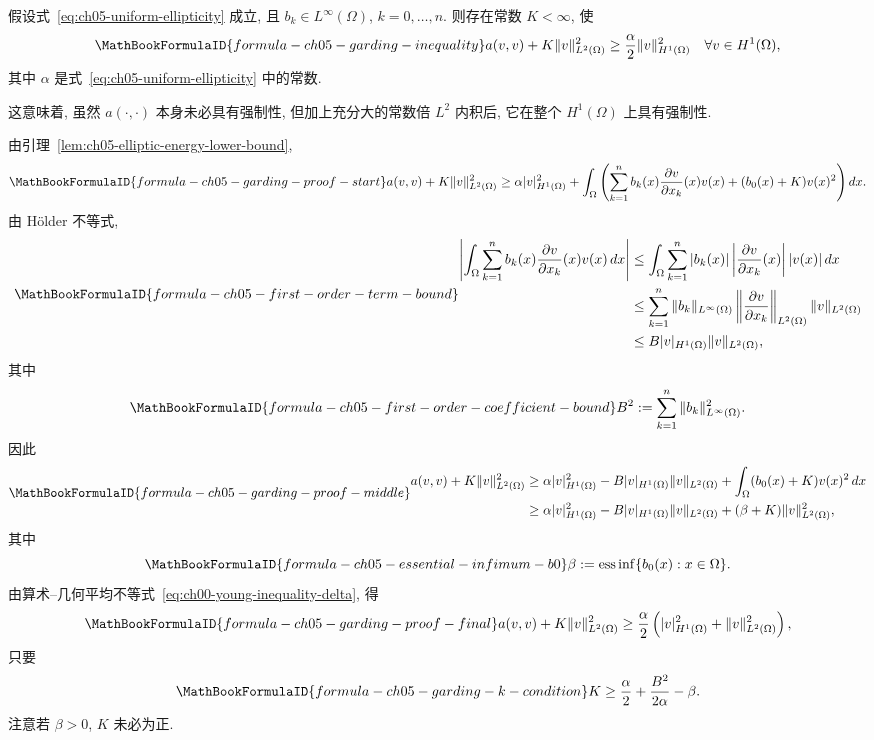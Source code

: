 \begin{Theorem}
\label{thm:ch05-garding-inequality}
假设式~\eqref{eq:ch05-uniform-ellipticity} 成立, 且 $b_k\in L^\infty(\Omega)$, $k=0,\ldots,n$. 则存在常数 $K<\infty$, 使
\[
\MathBookFormulaID{formula-ch05-garding-inequality}
a(v,v)+K\|v\|_{L^2(\Omega)}^2
\geq\frac\alpha2\|v\|_{H^1(\Omega)}^2
\quad\forall v\in H^1(\Omega),
\]
其中 $\alpha$ 是式~\eqref{eq:ch05-uniform-ellipticity} 中的常数.
\end{Theorem}
这意味着, 虽然 $a(\cdot,\cdot)$ 本身未必具有强制性, 但加上充分大的常数倍 $L^2$ 内积后, 它在整个 $H^1(\Omega)$ 上具有强制性.
\begin{Proof}
由引理~\ref{lem:ch05-elliptic-energy-lower-bound},
\[
\MathBookFormulaID{formula-ch05-garding-proof-start}
a(v,v)+K\|v\|_{L^2(\Omega)}^2
\geq\alpha|v|_{H^1(\Omega)}^2
+\int_\Omega\left(\sum_{k=1}^nb_k(x)\frac{\partial v}{\partial x_k}(x)v(x)
+(b_0(x)+K)v(x)^2\right)dx.
\]
由 Hölder 不等式,
\[
\MathBookFormulaID{formula-ch05-first-order-term-bound}
\begin{aligned}
\left|\int_\Omega\sum_{k=1}^nb_k(x)\frac{\partial v}{\partial x_k}(x)v(x)\,dx\right|
&\leq\int_\Omega\sum_{k=1}^n|b_k(x)|
\left|\frac{\partial v}{\partial x_k}(x)\right||v(x)|\,dx\\
&\leq\sum_{k=1}^n\|b_k\|_{L^\infty(\Omega)}
\left\|\frac{\partial v}{\partial x_k}\right\|_{L^2(\Omega)}\|v\|_{L^2(\Omega)}\\
&\leq B|v|_{H^1(\Omega)}\|v\|_{L^2(\Omega)},
\end{aligned}
\]
其中
\begin{equation}
\MathBookFormulaID{formula-ch05-first-order-coefficient-bound}
\label{eq:ch05-first-order-coefficient-bound}
B^2:=\sum_{k=1}^n\|b_k\|_{L^\infty(\Omega)}^2.
\end{equation}
因此
\[
\MathBookFormulaID{formula-ch05-garding-proof-middle}
\begin{aligned}
a(v,v)+K\|v\|_{L^2(\Omega)}^2
&\geq\alpha|v|_{H^1(\Omega)}^2
-B|v|_{H^1(\Omega)}\|v\|_{L^2(\Omega)}
+\int_\Omega(b_0(x)+K)v(x)^2\,dx\\
&\geq\alpha|v|_{H^1(\Omega)}^2
-B|v|_{H^1(\Omega)}\|v\|_{L^2(\Omega)}
+(\beta+K)\|v\|_{L^2(\Omega)}^2,
\end{aligned}
\]
其中
\begin{equation}
\MathBookFormulaID{formula-ch05-essential-infimum-b0}
\label{eq:ch05-essential-infimum-b0}
\beta:=\operatorname*{ess\,inf}\{b_0(x):x\in\Omega\}.
\end{equation}
由算术--几何平均不等式~\eqref{eq:ch00-young-inequality-delta}, 得
\[
\MathBookFormulaID{formula-ch05-garding-proof-final}
a(v,v)+K\|v\|_{L^2(\Omega)}^2
\geq\frac\alpha2\left(|v|_{H^1(\Omega)}^2+\|v\|_{L^2(\Omega)}^2\right),
\]
只要
\begin{equation}
\MathBookFormulaID{formula-ch05-garding-k-condition}
\label{eq:ch05-garding-k-condition}
K\geq\frac\alpha2+\frac{B^2}{2\alpha}-\beta.
\end{equation}
注意若 $\beta>0$, $K$ 未必为正.
\end{Proof}

